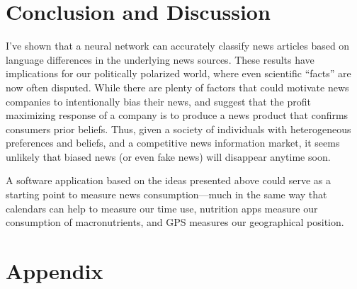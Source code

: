 \documentclass{article}
\begin{document}
	\section{Conclusion and Discussion}
	I've shown that a neural network can accurately classify news articles based on language differences in the underlying news sources. These results have implications for our politically polarized world, where even scientific ``facts'' are now often disputed. While there are plenty of factors that could motivate news companies to intentionally bias their news,  \citet{gentzkow2008competition} and \citet{gentzkow2006media} suggest that the profit maximizing response of a company is to produce a news product that confirms consumers prior beliefs. Thus, given a society of individuals with heterogeneous preferences and beliefs, and a competitive news information market, it seems unlikely that biased news (or even fake news) will disappear anytime soon. 
	
	A software application based on the ideas presented above could serve as a starting point to measure news consumption---much in the same way that calendars can help to measure our time use, nutrition apps measure our consumption of macronutrients, and GPS measures our geographical position. 
	
	\newpage
	
	\section{Appendix}
	
	\begin{center}
		
		
		
		
	    
		
		
	\end{center}

	\newpage
	
	
	
	
\end{document}
